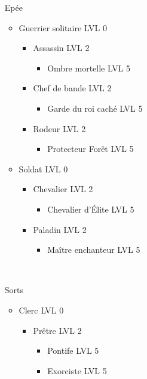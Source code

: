 \begin{itemize}
	\item[Epée] ~\\
		\begin{itemize}
			\item Guerrier solitaire LVL 0
				\begin{itemize}
					\item Assassin LVL 2
						\begin{itemize}
							\item Ombre mortelle LVL 5
						\end{itemize}
					\item Chef de bande LVL 2
						\begin{itemize}
							\item Garde du roi caché LVL 5
						\end{itemize}
					\item Rodeur     LVL 2
						\begin{itemize}
							\item Protecteur Forêt LVL 5
						\end{itemize}
				\end{itemize}
			\item Soldat LVL 0
				\begin{itemize}
					\item Chevalier LVL 2
						\begin{itemize}
							\item Chevalier d'Élite LVL 5
						\end{itemize}
					\item Paladin LVL 2
						\begin{itemize}
							\item Maître enchanteur LVL 5
						\end{itemize}
				\end{itemize}
		\end{itemize}
		~\\
	\item[Sorts] ~\\
		\begin{itemize}
			\item Clerc LVL 0
				\begin{itemize}
					\item Prêtre LVL 2
						\begin{itemize}
							\item Pontife LVL 5
							\item Exorciste LVL 5
						\end{itemize}

\end{itemize}
\end{itemize}
\end{itemize}
